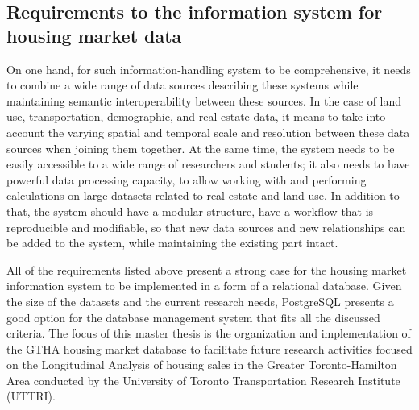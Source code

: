 \subsection{Requirements to the information system for housing market data} \label{subsec:requirements_to_information_system}

On one hand, for such information-handling system to be comprehensive, it needs to combine a wide range of data sources describing these systems while maintaining semantic interoperability between these sources.
In the case of land use, transportation, demographic, and real estate data, it means to take into account the varying spatial and temporal scale and resolution between these data sources when joining them together.
At the same time, the system needs to be easily accessible to a wide range of researchers and students;
it also needs to have powerful data processing capacity, to allow working with and performing calculations on large datasets related to real estate and land use.
In addition to that, the system should have a modular structure, have a workflow that is reproducible and modifiable, so that new data sources and new relationships can be added to the system, while maintaining the existing part intact.

All of the requirements listed above present a strong case for the housing market information system to be implemented in a form of a relational database.
Given the size of the datasets and the current research needs, PostgreSQL presents a good option for the database management system that fits all the discussed criteria.
The focus of this master thesis is the organization and implementation of the GTHA housing market database to facilitate future research activities focused on the Longitudinal Analysis of housing sales in the Greater Toronto-Hamilton Area conducted by the University of Toronto Transportation Research Institute (UTTRI).

